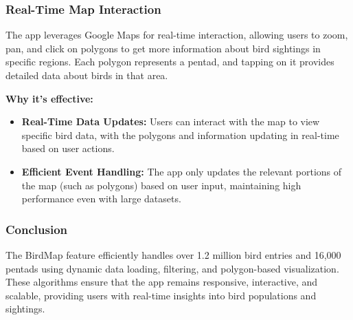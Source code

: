 \documentclass{article}
\begin{document}
\subsubsection{Real-Time Map Interaction}
The app leverages Google Maps for real-time interaction, allowing users to zoom, pan, and click on polygons to get more information about bird sightings in specific regions. Each polygon represents a pentad, and tapping on it provides detailed data about birds in that area.

\textbf{Why it's effective:}
\begin{itemize}
    \item \textbf{Real-Time Data Updates:} Users can interact with the map to view specific bird data, with the polygons and information updating in real-time based on user actions.
    \item \textbf{Efficient Event Handling:} The app only updates the relevant portions of the map (such as polygons) based on user input, maintaining high performance even with large datasets.
\end{itemize}

\subsubsection{Conclusion}
The BirdMap feature efficiently handles over 1.2 million bird entries and 16,000 pentads using dynamic data loading, filtering, and polygon-based visualization. These algorithms ensure that the app remains responsive, interactive, and scalable, providing users with real-time insights into bird populations and sightings.
\end{document}
